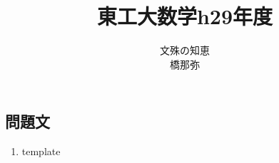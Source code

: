 \documentclass[dvipdfmx,titlepage, 11pt, a4paper]{jsarticle}%
\title{\Huge 東工大数学h29年度\\[10mm]}
\author{{\LARGE 文殊の知恵}\\[1mm]\LARGE \CID{8705}橋那弥}
\date{}
\begin{document}
\maketitle
\tableofcontents %
\newpage
\setcounter{tocdepth}{3}%
\section{}%
\subsection{問題文}
\begin{enumerate}[(1)]
  \item template
\end{enumerate}
\newpage
\end{document}
